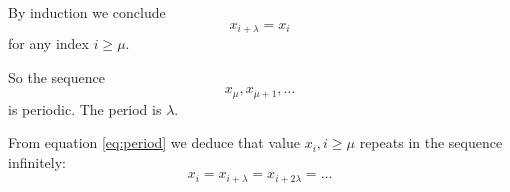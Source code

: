 \documentclass[12pt,a4paper]{article}
\begin{document}
By induction we conclude
\begin{equation}\label{eq:period}
x_{i + \lambda} = x_{i}
\end{equation}
for any index $ i \geq \mu $.

So the sequence 
\begin{equation}
x_{\mu}, x_{\mu + 1}, \ldots
\end{equation}
is periodic. The period is $ \lambda $.

From equation \ref{eq:period} we deduce that value $ x_{i}, i \geq \mu $ repeats in the sequence infinitely:
\begin{equation}
x_{i} = x_{i + \lambda} = x_{i + 2 \lambda} = \ldots
\end{equation}
\end{document}
